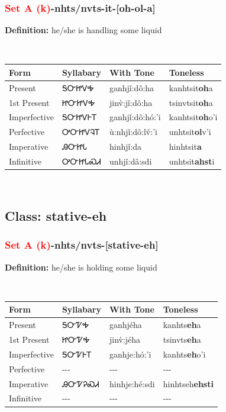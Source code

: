 \subsubsection*{\textcolor{Red}{Set A (k)}{-}\textbf{nhts/nvts}{-}it{-}[oh-ol-a]}
\nopagebreak
\textbf{Definition: } he/she is handling some liquid
\\[0.5em]
\begin{tabularx}{\textwidth}{l X X X}%
\toprule%
\textbf{Form}&\textbf{Syllabary}&\textbf{With Tone}&\textbf{Toneless}\\%
\midrule%
Present&ᎦᏅᏥᏙᎭ&ganhjǐ:dô:ha&kanhtsit\textbf{oh}a\\%
1st Present&ᏥᏅᏥᏙᎭ&jinv̀:jǐ:dô:ha&tsinvtsit\textbf{oh}a\\%
Imperfective&ᎦᏅᏥᏙᎰᎢ&ganhjǐ:dô:hó:’i&kanhtsit\textbf{oh}o'i\\%
Perfective&ᎤᏅᏥᏙᎸᎢ&ù:nhjǐ:dô:lv̌:’i&unhtsit\textbf{ol}v'i\\%
Imperative&ᎯᏅᏥᏓ&hinhjǐ:da&hinhtsit\textbf{a}\\%
Infinitive&ᎤᏅᏥᏓᏍᏗ&unhjǐ:dâ:sdi&unhtsit\textbf{ahst}i\\%
\bottomrule%
\end{tabularx}
\\[1em]
\needspace{3in}
\subsection*{Class: stative-eh}
\nopagebreak
\needspace{2in}
\subsubsection*{\textcolor{Red}{Set A (k)}{-}\textbf{nhts/nvts}{-}[stative-eh]}
\nopagebreak
\textbf{Definition: } he/she is holding some liquid
\\[0.5em]
\begin{tabularx}{\textwidth}{l X X X}%
\toprule%
\textbf{Form}&\textbf{Syllabary}&\textbf{With Tone}&\textbf{Toneless}\\%
\midrule%
Present&ᎦᏅᏤᎭ&ganhjéha&kanhts\textbf{eh}a\\%
1st Present&ᏥᏅᏤᎭ&jinv̀:jéha&tsinvts\textbf{eh}a\\%
Imperfective&ᎦᏅᏤᎰᎢ&ganhje:hó:’i&kanhts\textbf{eh}o'i\\%
Perfective&{-}{-}{-}&{-}{-}{-}&{-}{-}{-}\\%
Imperative&ᎯᏅᏤᎮᏍᏗ&hinhje:hé:sdi&hinhtseh\textbf{ehsti}\\%
Infinitive&{-}{-}{-}&{-}{-}{-}&{-}{-}{-}\\%
\bottomrule%
\end{tabularx}
\\[1em]